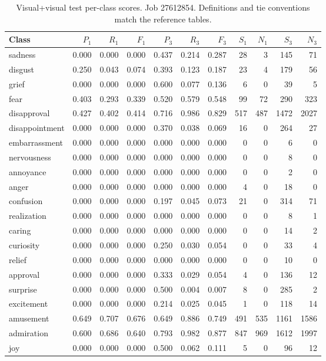 \begin{table}[!htbp]
\centering
\scriptsize
\setlength{\tabcolsep}{5pt}
\begin{tabular}{lrrrrrrrrrr}
\toprule
Class & $P_1$ & $R_1$ & $F_1$ & $P_3$ & $R_3$ & $F_3$ & $S_1$ & $N_1$ & $S_3$ & $N_3$ \\
\midrule
sadness & 0.000 & 0.000 & 0.000 & 0.437 & 0.214 & 0.287 & 28 & 3 & 145 & 71 \\
disgust & 0.250 & 0.043 & 0.074 & 0.393 & 0.123 & 0.187 & 23 & 4 & 179 & 56 \\
grief & 0.000 & 0.000 & 0.000 & 0.600 & 0.077 & 0.136 & 6 & 0 & 39 & 5 \\
fear & 0.403 & 0.293 & 0.339 & 0.520 & 0.579 & 0.548 & 99 & 72 & 290 & 323 \\
disapproval & 0.427 & 0.402 & 0.414 & 0.716 & 0.986 & 0.829 & 517 & 487 & 1472 & 2027 \\
disappointment & 0.000 & 0.000 & 0.000 & 0.370 & 0.038 & 0.069 & 16 & 0 & 264 & 27 \\
embarrassment & 0.000 & 0.000 & 0.000 & 0.000 & 0.000 & 0.000 & 0 & 0 & 6 & 0 \\
nervousness & 0.000 & 0.000 & 0.000 & 0.000 & 0.000 & 0.000 & 0 & 0 & 8 & 0 \\
annoyance & 0.000 & 0.000 & 0.000 & 0.000 & 0.000 & 0.000 & 0 & 0 & 2 & 0 \\
anger & 0.000 & 0.000 & 0.000 & 0.000 & 0.000 & 0.000 & 4 & 0 & 18 & 0 \\
confusion & 0.000 & 0.000 & 0.000 & 0.197 & 0.045 & 0.073 & 21 & 0 & 314 & 71 \\
realization & 0.000 & 0.000 & 0.000 & 0.000 & 0.000 & 0.000 & 0 & 0 & 8 & 1 \\
caring & 0.000 & 0.000 & 0.000 & 0.000 & 0.000 & 0.000 & 0 & 0 & 14 & 2 \\
curiosity & 0.000 & 0.000 & 0.000 & 0.250 & 0.030 & 0.054 & 0 & 0 & 33 & 4 \\
relief & 0.000 & 0.000 & 0.000 & 0.000 & 0.000 & 0.000 & 0 & 0 & 10 & 0 \\
approval & 0.000 & 0.000 & 0.000 & 0.333 & 0.029 & 0.054 & 4 & 0 & 136 & 12 \\
surprise & 0.000 & 0.000 & 0.000 & 0.500 & 0.004 & 0.007 & 8 & 0 & 285 & 2 \\
excitement & 0.000 & 0.000 & 0.000 & 0.214 & 0.025 & 0.045 & 1 & 0 & 118 & 14 \\
amusement & 0.649 & 0.707 & 0.676 & 0.649 & 0.886 & 0.749 & 491 & 535 & 1161 & 1586 \\
admiration & 0.600 & 0.686 & 0.640 & 0.793 & 0.982 & 0.877 & 847 & 969 & 1612 & 1997 \\
joy & 0.000 & 0.000 & 0.000 & 0.500 & 0.062 & 0.111 & 5 & 0 & 96 & 12 \\
\bottomrule
\end{tabular}
\caption{Visual+visual test per-class scores. Job 27612854. Definitions and tie conventions match the reference tables.}
\label{tab:classes-description_visual_control}
\end{table}
